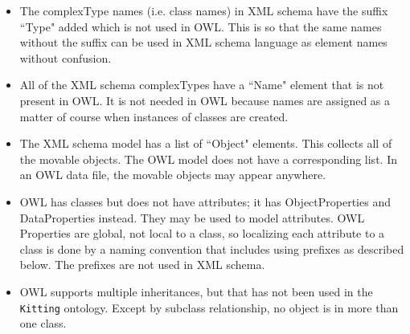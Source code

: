 \begin{itemize}
  \item The \textsf{complexType} names (i.e. class names) in XML schema have the suffix ``Type" added which is not used in OWL. This is so that the same names without the suffix can be used in XML schema language as element names without confusion.
  \item All of the XML schema \textsf{complexTypes} have a ``Name" element that is not present in OWL. It is not needed in OWL because names are assigned as a matter of course when instances of classes are created.
  \item The XML schema model has a list of ``Object" elements. This collects all of the movable objects. The OWL model does not have a corresponding list. In an OWL data file, the movable objects may appear anywhere.
  \item OWL has classes but does not have attributes; it has \textsf{ObjectProperties} and \textsf{DataProperties} instead. They may be used to model attributes. OWL Properties are global, not local to a class, so localizing each attribute to a class is done by a naming convention that includes using prefixes as described below. The prefixes are not used in XML schema.
  \item OWL supports multiple inheritances, but that has not been used in the \texttt{Kitting} ontology. Except by subclass relationship, no object is in more than one class.
\end{itemize}
